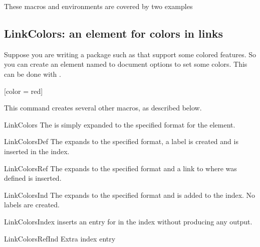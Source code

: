 \documentclass[11pt, outputdir = ./out]{article}
\begin{document}
\bigskip
These macros and environments are covered by two examples

\subsection*{LinkColors: an element for colors in links}

Suppose you are writing a package such as  that support some colored features. So you can create an element named  to document options to set some colors. This can be done with .

\begin{latexcode}
    [color = red]
\end{latexcode}

This command creates several other macros, as described below.

\begin{Macro*}{LinkColors}{}{}
    The  is simply expanded to the specified format for the element.
\end{Macro*}

\begin{Macro*}{LinkColorsDef}{}{}
    The  expands to the specified format, a label is created and  is inserted in the index.
\end{Macro*}

\begin{Macro*}{LinkColorsRef}{}{}
    The  expands to the specified format and a link to where  was defined is inserted.
\end{Macro*}

\begin{Macro*}{LinkColorsInd}{}{}
    The  expands to the specified format and  is added to the index. No labels are created.
\end{Macro*}

\begin{Macro*}{LinkColorsIndex}{}{}
     inserts an entry for  in the index without producing any output.
\end{Macro*}

\begin{Macro*}{LinkColorsRefInd}{}{}
    Extra index entry
\end{Macro*}
\end{document}
